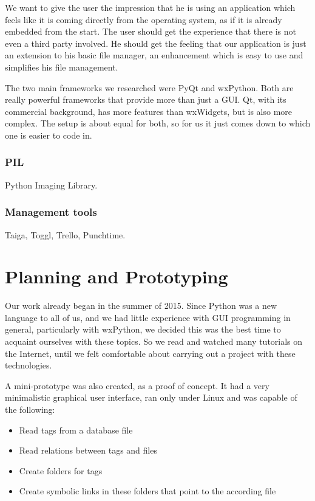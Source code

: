 We want to give the user the impression that he is using an application which feels like it is coming directly from the operating system, as if it is already embedded from the start. The user should get the experience that there is not even a third party involved. He should get the feeling that our application is just an extension to his basic file manager, an enhancement which is easy to use and simplifies his file management.

The two main frameworks we researched were PyQt and wxPython. Both are really powerful frameworks that provide more than just a GUI. Qt, with its commercial background, has more features than wxWidgets, but is also more complex. The setup is about equal for both, so for us it just comes down to which one is easier to code in.

\subsubsection{PIL}
Python Imaging Library.

\subsubsection{Management tools}
Taiga, Toggl, Trello, Punchtime.

\section{Planning and Prototyping} %
\def\kapitelautor{Erik Ritschl}

Our work already began in the summer of 2015. Since Python was a new language
to all of us, and we had little experience with GUI programming in general,
particularly with wxPython, we decided this was the best time
to acquaint ourselves with these topics. So we read and watched many tutorials
on the Internet, until we felt comfortable about carrying out a project with
these technologies.

A mini-prototype was also created, as a proof of concept. It had a very
minimalistic graphical user interface, ran only under Linux and was capable of
the following:

\begin{itemize}
	\item Read tags from a database file
	\item Read relations between tags and files
	\item Create folders for tags
	\item Create symbolic links in these folders that point to the according file
\end{itemize}

